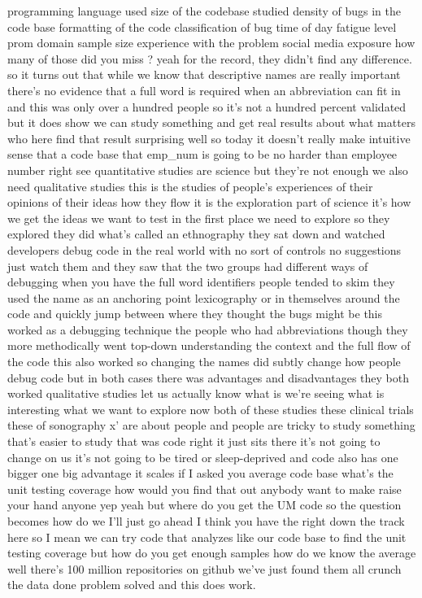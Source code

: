 \documentclass[conference, compsoc, twoside]{IEEEtran}
\begin{document}
programming language used size of the
codebase studied
density of bugs in the code base 
formatting of the code
classification of bug time of day
fatigue level 
prom domain 
sample size
experience with the problem 
social media exposure
how many of those did you miss ?
yeah for the record, they didn't find any difference.
 so it turns out that while we
know that descriptive names are really
important there's no evidence that a
full word is required when an
abbreviation can fit in and this was
only over a hundred people so it's not a
hundred percent validated but it does
show we can study something and get real
results about what matters who here find
that result surprising well so today it
doesn't really make intuitive sense that
a code base that emp\_num is going to be
no harder than employee number right see
quantitative studies are science but
they're not enough we also need
qualitative studies this is the studies
of people's experiences of their
opinions of their ideas how they flow it
is the exploration part of science it's
how we get the ideas we want to test in
the first place we need to explore so
they explored they did what's called an
ethnography they sat down and watched
developers debug code in the real world
with no sort of controls no suggestions
just watch them and they saw that the
two groups had different ways of
debugging when you have the full word
identifiers people tended to skim they
used the name as an anchoring point
lexicography or in themselves around the code and
quickly jump between where they thought
the bugs might be this worked as a
debugging technique the people who had
abbreviations though they more
methodically went top-down understanding
the context and the full flow of the
code this also worked so changing the
names did subtly change how people debug
code but in both cases there was
advantages and disadvantages they both
worked qualitative studies let us
actually know what is we're seeing what
is interesting what we want to explore
now both of these studies these clinical
trials these of sonography x' are about
people and people are tricky to study
something that's easier to study that
was code right it just sits there it's
not going to change on us it's not going
to be tired or sleep-deprived and code
also has one bigger one big advantage it
scales if I asked you average code base
what's the unit testing coverage how
would you find that out anybody want to
make raise your hand anyone yep yeah but
where do you get the UM code so the
question becomes how do we I'll just go
ahead I think you have the right down
the track here so I mean we can try code
that analyzes like our code base to find
the unit testing coverage but how do you
get enough samples how do we know the
average well there's 100 million
repositories on github we've just found
them all crunch the data done problem solved and this does work.
\end{document}
